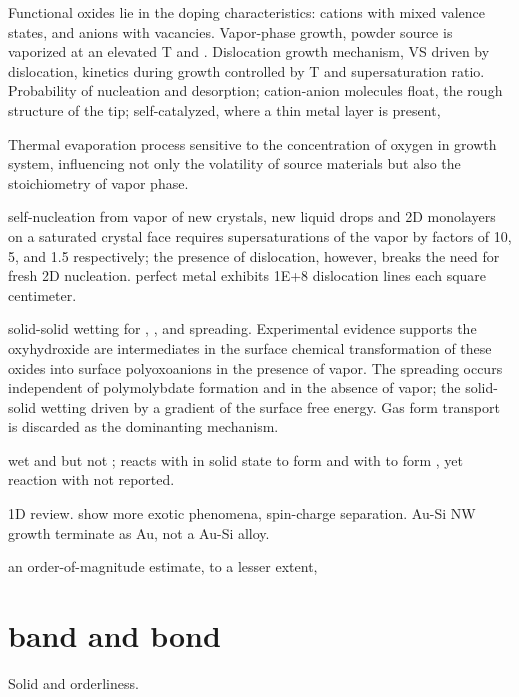Functional oxides lie in the doping characteristics: cations with mixed valence states, and anions with vacancies. Vapor-phase growth, powder source is vaporized at an elevated T and .\cite{Dai2003} Dislocation growth mechanism, VS driven by dislocation, kinetics during growth controlled by T and supersaturation ratio. Probability of nucleation and desorption; cation-anion molecules float, the rough structure of the tip; self-catalyzed, where a thin metal layer is present, \cite{Sears1955,Blakely1962}

Thermal evaporation process sensitive to the concentration of oxygen in growth system, influencing not only the volatility of source materials but also the stoichiometry of vapor phase.\cite{Dai2002} 

self-nucleation from vapor of new crystals, new liquid drops and 2D monolayers on a saturated crystal face requires supersaturations of the vapor by factors of 10, 5, and 1.5 respectively; the presence of dislocation, however, breaks the need for fresh 2D nucleation. perfect metal exhibits 1E+8 dislocation lines each square centimeter.\cite{Frank1949}

solid-solid wetting for , , and  spreading.\cite{Leyrer1988} Experimental evidence supports the oxyhydroxide are intermediates in the surface chemical transformation of these oxides into surface polyoxoanions in the presence of  vapor. The spreading occurs independent of polymolybdate formation and in the absence of  vapor; the solid-solid wetting driven by a gradient of the surface free energy. Gas form transport is discarded as the dominanting mechanism. 

 wet  and  but not ;  reacts with  in solid state to form  and with  to form , yet reaction with  not reported. 

1D review. show more exotic phenomena, spin-charge separation. Au-Si NW growth terminate as Au, not a Au-Si alloy.\cite{Hu1999}



an order-of-magnitude estimate, to a lesser extent, 

\section{band and bond}

Solid and orderliness.

